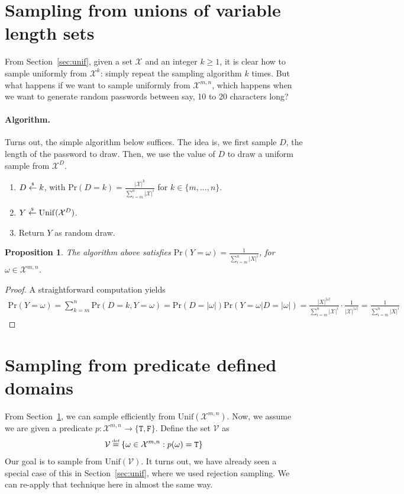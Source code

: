 \documentclass[10pt]{article}
\newtheorem{myprop}{Proposition}
\newcommand{\X}{\mathcal{X}}
\newcommand{\abs}[1]{\left| #1 \right|}
\newcommand{\Unif}{\mathrm{Unif}}
\renewcommand{\Pr}{\mathrm{Pr}}
\newcommand\defeq{\stackrel{\mathclap{\normalfont\tiny\mbox{def}}}{=}}
\newcommand\rgets{\stackrel{\mathclap{\normalfont\tiny\mbox{\$}}}{\gets}}
\begin{document}
\section{Sampling from unions of variable length sets}
\label{sec:var}
From Section~\ref{sec:unif}, given a set $\X$ and an integer $k \geq 1$, it is
clear how to sample uniformly from $\X^k$: simply repeat the sampling algorithm
$k$ times. But what happens if we want to sample uniformly from $\X^{m,n}$,
which happens when we want to generate random passwords between say, 10 to 20
characters long? 

\paragraph{Algorithm.} Turns out, the simple algorithm below suffices. The idea is,
we first sample $D$, the length of the password to draw. Then, we use the value of
$D$ to draw a uniform sample from $\X^D$.
\begin{enumerate}
  \item $D \rgets k$, with $\Pr(D=k) = \frac{\abs{\X}^k}{\sum_{i=m}^{n} \abs{\X}^i}$ for $k \in \{m, ..., n\}$.
  \item $Y \rgets \Unif(\X^{D})$.
  \item Return $Y$ as random draw.
\end{enumerate}

\begin{myprop}
The algorithm above satisfies $\Pr(Y = \omega) = \frac{1}{ \sum_{i=m}^{n} \abs{X}^i }$, for $\omega \in \X^{m,n}$.
\end{myprop}
\begin{proof}
A straightforward computation yields
\begin{align*}
  \Pr(Y=\omega) = \sum_{k=m}^{n} \Pr(D=k, Y=\omega) = \Pr(D=\abs{\omega})\Pr(Y=\omega | D=\abs{\omega}) = \frac{\abs{X}^{\abs{\omega}}}{ \sum_{i=m}^{n} \abs{\X}^i } \cdot \frac{1}{ \abs{\X}^{\abs{\omega}} } = \frac{1}{ \sum_{i=m}^{n} \abs{X}^i }
\end{align*}
\end{proof}

\section{Sampling from predicate defined domains}
From Section~\ref{sec:var}, we can sample efficiently from $\Unif(\X^{m,n})$. Now, we assume
we are given a predicate $p : \X^{m,n} \longrightarrow \{ \texttt{T}, \texttt{F} \}$.
Define the set $\mathcal{V}$ as
\begin{align*}
  \mathcal{V} \defeq \{ \omega \in \X^{m,n} : p(\omega) = \texttt{T} \}
\end{align*}
Our goal is to sample from $\Unif(\mathcal{V})$. It turns out, we have already
seen a special case of this in Section~\ref{sec:unif}, where we used rejection
sampling. We can re-apply that technique here in almost the same way. 
\end{document}
